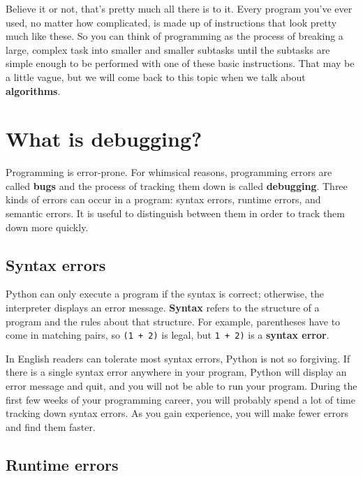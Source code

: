 Believe it or not, that's pretty much all there is to it.  Every
program you've ever used, no matter how complicated, is made up of
instructions that look pretty much like these.  So you can think of
programming as the process of breaking a large, complex task
into smaller and smaller subtasks until the subtasks are
simple enough to be performed with one of these basic instructions.
That may be a little vague, but we will come back to this topic
when we talk about {\bf algorithms}.

\section{What is debugging?}

Programming is error-prone.  For whimsical reasons, programming errors
are called {\bf bugs} and the process of tracking them down is called
{\bf debugging}.
Three kinds of errors can occur in a program: syntax errors, runtime 
errors, and semantic errors. It is useful
to distinguish between them in order to track them down more quickly.

\subsection{Syntax errors}

Python can only execute a program if the syntax is
correct; otherwise, the interpreter displays an error message.
{\bf Syntax} refers to the structure of a program and the rules about
that structure.  
For example, parentheses have to come in matching pairs, so
{\tt (1 + 2)} is legal, but {\tt 1 + 2)} is a {\bf syntax error}.


In English readers can tolerate most syntax errors, 
Python is not so forgiving.  If there is a single syntax error
anywhere in your program, Python will display an error message and quit,
and you will not be able to run your program. During the first few
weeks of your programming career, you will probably spend a lot of
time tracking down syntax errors.  As you gain experience, you will
make fewer errors and find them faster.

\subsection{Runtime errors}
\label{runtime}

